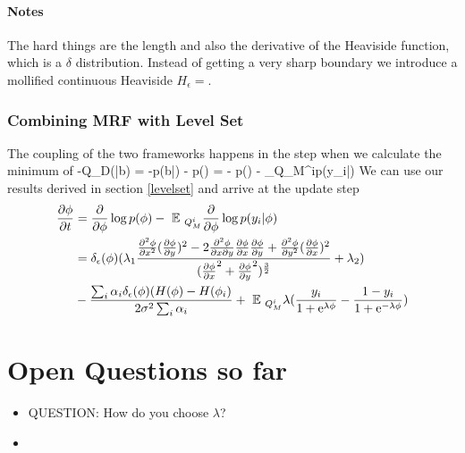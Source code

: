 \documentclass{article} %
\begin{document}
\paragraph{Notes}
The hard things are the length and also the derivative of the Heaviside function, which is a $\delta$ distribution. Instead of getting a very sharp boundary we introduce a mollified continuous Heaviside $H_{\epsilon} = $.

\subsubsection{Combining MRF with Level Set}
The coupling of the two frameworks happens in the step when we calculate the minimum of
\beqs
-\log Q_D(\phi|b) = -\log p(b|\phi) - \log p(\phi) = - \log p(\phi) - \EE_{Q_M^i}\log p(y_i|\phi)
\eeqs
We can use our results derived in section \ref{levelset} and arrive at the update step
\begin{align*}
\frac{\partial \phi}{\partial t} &= \frac{\partial}{\partial \phi} \log p(\phi) -\mbox{ }\mathbb{E}\mbox{ }_{Q_M^i} \frac{\partial}{\partial \phi} \log p(y_i|\phi)\\
&= \delta_{\epsilon}(\phi)(\lambda_1  \frac{ \frac{\partial^2 \phi}{\partial x^2} (\frac{\partial \phi}{\partial y})^2 - 2 \frac{\partial^2 \phi}{\partial x \partial y} \frac{\partial \phi}{\partial x}\frac{\partial \phi}{\partial y} +  \frac{\partial^2 \phi}{\partial y^2} (\frac{\partial \phi}{\partial x})^2}{(\frac{\partial \phi}{\partial x}^2  + \frac{\partial \phi}{\partial y}^2)^{\frac{3}{2}}} + \lambda_2) \\
&- \frac{\sum_i \alpha_i  \delta_{\epsilon}(\phi)(H(\phi)-H(\phi_i)}{2\sigma^2 \sum_i \alpha_i} + \mbox{ }\mathbb{E}\mbox{ }_{Q_M^i} \lambda(\frac{y_i}{1 +\mathrm{e}^{\lambda \phi}} - \frac{1-y_i}{1 + \mathrm{e}^{-\lambda \phi}})
\nonumber
\end{align*}

\section{Open Questions so far}
\begin{itemize}
\item QUESTION: How do you choose $\lambda$?
\item 
\end{itemize}

\FloatBarrier
\vskip 0.2in
\nocite{*}



\begin{appendices}

\end{appendices}
\end{document}
